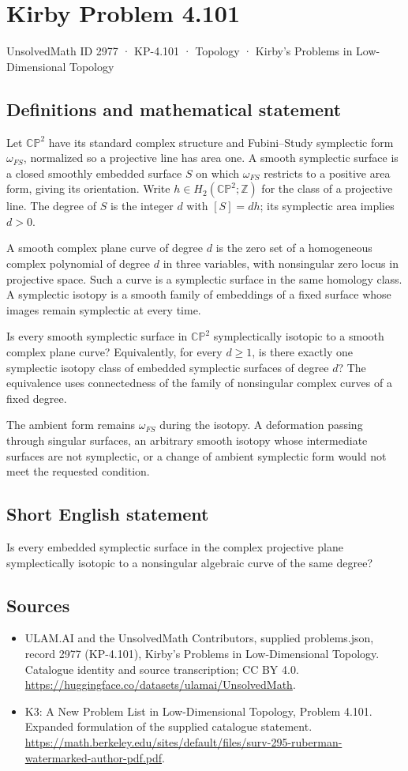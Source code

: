 \documentclass[11pt,a4paper]{article}
\begin{document}
\section*{Kirby Problem 4.101}\label{2977}
{\small UnsolvedMath ID 2977 · KP-4.101 · Topology · Kirby's Problems in Low-Dimensional Topology}
\subsection{Definitions and mathematical statement}
Let $\mathbb{CP}^2$ have its standard complex structure and
Fubini--Study symplectic form $\omega_{FS}$, normalized so a
projective line has area one. A smooth symplectic surface is a
closed smoothly embedded surface $S$ on which $\omega_{FS}$
restricts to a positive area form, giving its orientation.
Write $h\in H_2(\mathbb{CP}^2;\mathbb Z)$ for the class of
a projective line. The degree of $S$ is the integer $d$ with
$[S]=dh$; its symplectic area implies $d>0$.

A smooth complex plane curve of degree $d$ is the zero set of
a homogeneous complex polynomial of degree $d$ in three variables,
with nonsingular zero locus in projective space. Such a curve is
a symplectic surface in the same homology class.
A symplectic isotopy is a smooth family of embeddings of a fixed
surface whose images remain symplectic at every time.

Is every smooth symplectic surface in $\mathbb{CP}^2$
symplectically isotopic to a smooth complex plane curve?
Equivalently, for every $d\ge1$, is there exactly one symplectic
isotopy class of embedded symplectic surfaces of degree $d$?
The equivalence uses connectedness of the family of nonsingular
complex curves of a fixed degree.

The ambient form remains $\omega_{FS}$ during the isotopy.
A deformation passing through singular surfaces, an arbitrary smooth
isotopy whose intermediate surfaces are not symplectic, or a change
of ambient symplectic form would not meet the requested condition.
\subsection{Short English statement}
Is every embedded symplectic surface in the complex projective plane symplectically isotopic to a nonsingular algebraic curve of the same degree?
\subsection{Sources}
\begin{itemize}
\item[S1] ULAM.AI and the UnsolvedMath Contributors, supplied problems.json, record 2977 (KP-4.101), Kirby's Problems in Low-Dimensional Topology. Catalogue identity and source transcription; CC BY 4.0.
\url{https://huggingface.co/datasets/ulamai/UnsolvedMath}.
\item[S2] K3: A New Problem List in Low-Dimensional Topology, Problem 4.101. Expanded formulation of the supplied catalogue statement.
\url{https://math.berkeley.edu/sites/default/files/surv-295-ruberman-watermarked-author-pdf.pdf}.
\end{itemize}
\end{document}
